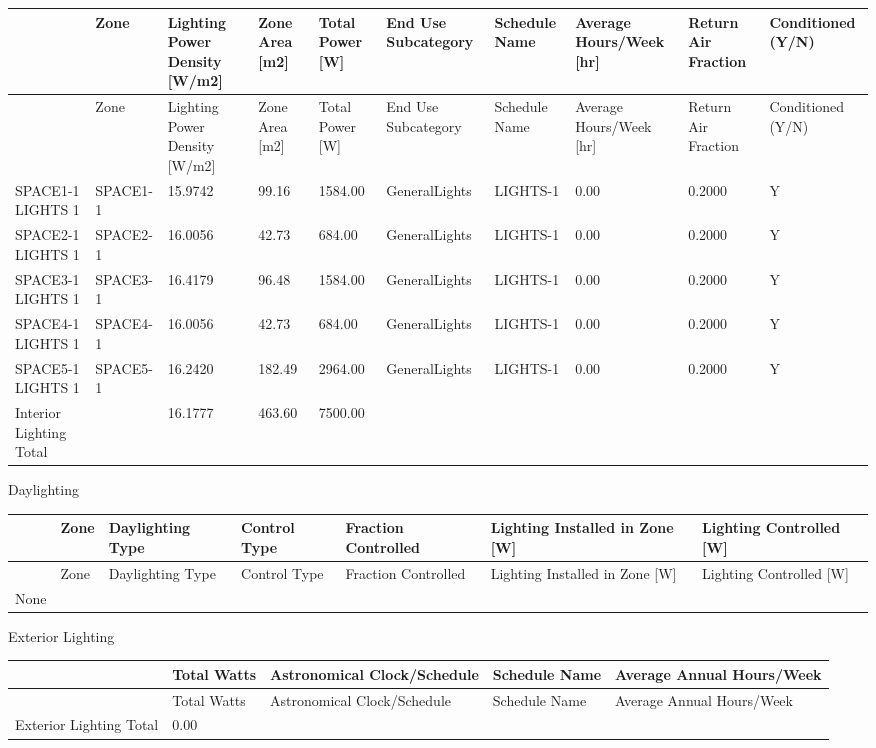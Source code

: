 \begin{longtable}[c]{p{0.6in}p{0.6in}p{0.6in}p{0.6in}p{0.6in}p{0.6in}p{0.6in}p{0.6in}p{0.6in}p{0.6in}}
\toprule 
~ & Zone & Lighting Power Density [W/m2] & Zone Area [m2] & Total Power [W] & End Use Subcategory & Schedule Name & Average Hours/Week [hr] & Return Air Fraction & Conditioned (Y/N) \tabularnewline
\midrule
\endfirsthead

\toprule 
~ & Zone & Lighting Power Density [W/m2] & Zone Area [m2] & Total Power [W] & End Use Subcategory & Schedule Name & Average Hours/Week [hr] & Return Air Fraction & Conditioned (Y/N) \tabularnewline
\midrule
\endhead

SPACE1-1 LIGHTS 1 & SPACE1-1 & 15.9742 & 99.16 & 1584.00 & GeneralLights & LIGHTS-1 & 0.00 & 0.2000 & Y \tabularnewline
SPACE2-1 LIGHTS 1 & SPACE2-1 & 16.0056 & 42.73 & 684.00 & GeneralLights & LIGHTS-1 & 0.00 & 0.2000 & Y \tabularnewline
SPACE3-1 LIGHTS 1 & SPACE3-1 & 16.4179 & 96.48 & 1584.00 & GeneralLights & LIGHTS-1 & 0.00 & 0.2000 & Y \tabularnewline
SPACE4-1 LIGHTS 1 & SPACE4-1 & 16.0056 & 42.73 & 684.00 & GeneralLights & LIGHTS-1 & 0.00 & 0.2000 & Y \tabularnewline
SPACE5-1 LIGHTS 1 & SPACE5-1 & 16.2420 & 182.49 & 2964.00 & GeneralLights & LIGHTS-1 & 0.00 & 0.2000 & Y \tabularnewline
Interior Lighting Total & ~ & 16.1777 & 463.60 & 7500.00 & ~ & ~ & ~ & ~ & ~ \tabularnewline
\bottomrule
\end{longtable}

Daylighting

\begin{longtable}[c]{p{0.85in}p{0.85in}p{0.85in}p{0.85in}p{0.85in}p{0.85in}p{0.85in}}
\toprule 
~ & Zone & Daylighting Type & Control Type & Fraction Controlled & Lighting Installed in Zone [W] & Lighting Controlled [W] \tabularnewline
\midrule
\endfirsthead

\toprule 
~ & Zone & Daylighting Type & Control Type & Fraction Controlled & Lighting Installed in Zone [W] & Lighting Controlled [W] \tabularnewline
\midrule
\endhead

None & ~ & ~ & ~ & ~ & ~ & ~ \tabularnewline
\bottomrule
\end{longtable}

Exterior Lighting

\begin{longtable}[c]{p{1.2in}p{1.2in}p{1.2in}p{1.2in}p{1.2in}}
\toprule 
~ & Total Watts & Astronomical Clock/Schedule & Schedule Name & Average Annual Hours/Week \tabularnewline
\midrule
\endfirsthead

\toprule 
~ & Total Watts & Astronomical Clock/Schedule & Schedule Name & Average Annual Hours/Week \tabularnewline
\midrule
\endhead

Exterior Lighting Total & 0.00 & ~ & ~ & ~ \tabularnewline
\bottomrule
\end{longtable}

